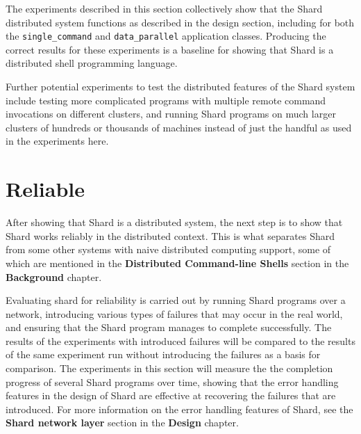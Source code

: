 \documentclass[twoside]{report}
\newcommand{\todoi}[1]{\todo[inline, color=blue!20]{TODO: {#1}}}
\begin{document}
\todoi{Some analysis on the actual results}

The experiments described in this section collectively show that the Shard distributed system functions as described in the design section, including for both the \texttt{single\_command} and \texttt{data\_parallel} application classes.
Producing the correct results for these experiments is a baseline for showing that Shard is a distributed shell programming language.

Further potential experiments to test the distributed features of the Shard system include testing more complicated programs with multiple remote command invocations on different clusters, and running Shard programs on much larger clusters of hundreds or thousands of machines instead of just the handful as used in the experiments here.

\section{Reliable}


After showing that Shard is a distributed system, the next step is to show that Shard works reliably in the distributed context.
This is what separates Shard from some other systems with naive distributed computing support, some of which are mentioned in the \textbf{Distributed Command-line Shells} section in the \textbf{Background} chapter.

Evaluating shard for reliability is carried out by running Shard programs over a network, introducing various types of failures that may occur in the real world, and ensuring that the Shard program manages to complete successfully.
The results of the experiments with introduced failures will be compared to the results of the same experiment run without introducing the failures as a basis for comparison.
The experiments in this section will measure the the completion progress of several Shard programs over time, showing that the error handling features in the design of Shard are effective at recovering the failures that are introduced.
For more information on the error handling features of Shard, see the \textbf{Shard network layer} section in the \textbf{Design} chapter.
\end{document}

